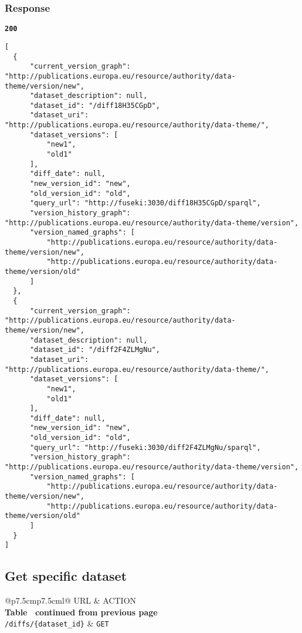 \subsubsection{Response}
\textbf{\texttt{200}}
\begin{lstlisting}
[
  {
      "current_version_graph": "http://publications.europa.eu/resource/authority/data-theme/version/new",
      "dataset_description": null,
      "dataset_id": "/diff18H35CGpD",
      "dataset_uri": "http://publications.europa.eu/resource/authority/data-theme/",
      "dataset_versions": [
          "new1",
          "old1"
      ],
      "diff_date": null,
      "new_version_id": "new",
      "old_version_id": "old",
      "query_url": "http://fuseki:3030/diff18H35CGpD/sparql",
      "version_history_graph": "http://publications.europa.eu/resource/authority/data-theme/version",
      "version_named_graphs": [
          "http://publications.europa.eu/resource/authority/data-theme/version/new",
          "http://publications.europa.eu/resource/authority/data-theme/version/old"
      ]
  },
  {
      "current_version_graph": "http://publications.europa.eu/resource/authority/data-theme/version/new",
      "dataset_description": null,
      "dataset_id": "/diff2F4ZLMgNu",
      "dataset_uri": "http://publications.europa.eu/resource/authority/data-theme/",
      "dataset_versions": [
          "new1",
          "old1"
      ],
      "diff_date": null,
      "new_version_id": "new",
      "old_version_id": "old",
      "query_url": "http://fuseki:3030/diff2F4ZLMgNu/sparql",
      "version_history_graph": "http://publications.europa.eu/resource/authority/data-theme/version",
      "version_named_graphs": [
          "http://publications.europa.eu/resource/authority/data-theme/version/new",
          "http://publications.europa.eu/resource/authority/data-theme/version/old"
      ]
  }
]
\end{lstlisting}

\subsection{Get specific dataset}

\begin{longtable}[c]{@{}p{7.5cm}p{7.5cm}l@{}}
  \toprule
  URL                             & ACTION                    \\* \midrule
  \endfirsthead
  \multicolumn{3}{c}%
  {{\bfseries Table \thetable\ continued from previous page}} \\
  \endhead
  \bottomrule
  \endfoot
  \endlastfoot
  \texttt{/diffs/\{dataset\_id\}} & \texttt{GET}              \\* \bottomrule
  \label{tab:rdf-differ-get-diffs}                            \\
\end{longtable}

